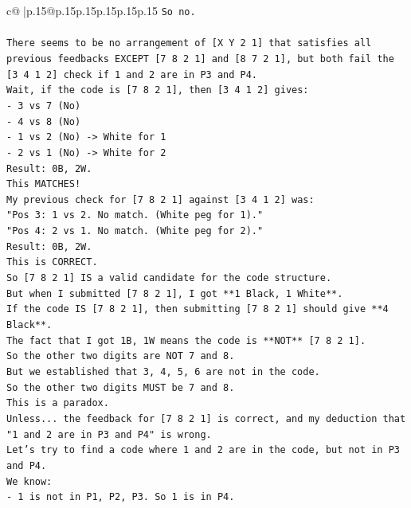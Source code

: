 \documentclass{article}
\begin{document}
{\begin{supertabular}{c@{$\;$}|p{.15\linewidth}@{}p{.15\linewidth}p{.15\linewidth}p{.15\linewidth}p{.15\linewidth}p{.15\linewidth}}
{{{\texttt{So no.} \\
\\ 
\texttt{There seems to be no arrangement of {[}X Y 2 1{]} that satisfies all previous feedbacks EXCEPT {[}7 8 2 1{]} and {[}8 7 2 1{]}, but both fail the {[}3 4 1 2{]} check if 1 and 2 are in P3 and P4.} \\
\texttt{Wait, if the code is {[}7 8 2 1{]}, then {[}3 4 1 2{]} gives:} \\
\texttt{{-} 3 vs 7 (No)} \\
\texttt{{-} 4 vs 8 (No)} \\
\texttt{{-} 1 vs 2 (No) {-}> White for 1} \\
\texttt{{-} 2 vs 1 (No) {-}> White for 2} \\
\texttt{Result: 0B, 2W.} \\
\texttt{This MATCHES!} \\
\texttt{My previous check for {[}7 8 2 1{]} against {[}3 4 1 2{]} was:} \\
\texttt{"Pos 3: 1 vs 2. No match. (White peg for 1)."} \\
\texttt{"Pos 4: 2 vs 1. No match. (White peg for 2)."} \\
\texttt{Result: 0B, 2W.} \\
\texttt{This is CORRECT.} \\
\texttt{So {[}7 8 2 1{]} IS a valid candidate for the code structure.} \\
\texttt{But when I submitted {[}7 8 2 1{]}, I got **1 Black, 1 White**.} \\
\texttt{If the code IS {[}7 8 2 1{]}, then submitting {[}7 8 2 1{]} should give **4 Black**.} \\
\texttt{The fact that I got 1B, 1W means the code is **NOT** {[}7 8 2 1{]}.} \\
\texttt{So the other two digits are NOT 7 and 8.} \\
\texttt{But we established that 3, 4, 5, 6 are not in the code.} \\
\texttt{So the other two digits MUST be 7 and 8.} \\
\texttt{This is a paradox.} \\
\texttt{Unless... the feedback for {[}7 8 2 1{]} is correct, and my deduction that "1 and 2 are in P3 and P4" is wrong.} \\
\texttt{Let's try to find a code where 1 and 2 are in the code, but not in P3 and P4.} \\
\texttt{We know:} \\
\texttt{{-} 1 is not in P1, P2, P3. So 1 is in P4.} \\
}}}
\end{supertabular}}
\end{document}
